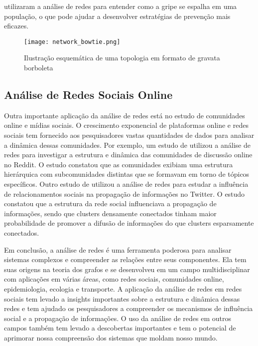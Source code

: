  utilizaram a análise de redes para entender como a gripe se espalha em uma população, o que pode ajudar a desenvolver estratégias de prevenção mais eficazes.
\begin{figure}[!htb]
    \caption{Ilustração esquemática de uma topologia em formato de gravata borboleta}
    \label{fig:network_bowtie}
    \centering
    \texttt{[image: network\_bowtie.png]}
\end{figure}

\subsection{Análise de Redes Sociais Online}

Outra importante aplicação da análise de redes está no estudo de comunidades online e mídias sociais. O crescimento exponencial de plataformas online e redes sociais tem fornecido aos pesquisadores vastas quantidades de dados para analisar a dinâmica dessas comunidades. Por exemplo, um estudo de utilizou a análise de redes para investigar a estrutura e dinâmica das comunidades de discussão online no Reddit. O estudo constatou que as comunidades exibiam uma estrutura hierárquica com subcomunidades distintas que se formavam em torno de tópicos específicos. Outro estudo de  utilizou a análise de redes para estudar a influência de relacionamentos sociais na propagação de informações no Twitter. O estudo constatou que a estrutura da rede social influenciava a propagação de informações, sendo que clusters densamente conectados tinham maior probabilidade de promover a difusão de informações do que clusters esparsamente conectados.

Em conclusão, a análise de redes é uma ferramenta poderosa para analisar sistemas complexos e compreender as relações entre seus componentes. Ela tem suas origens na teoria dos grafos e se desenvolveu em um campo multidisciplinar com aplicações em várias áreas, como redes sociais, comunidades online, epidemiologia, ecologia e transporte. A aplicação da análise de redes em redes sociais tem levado a insights importantes sobre a estrutura e dinâmica dessas redes e tem ajudado os pesquisadores a compreender os mecanismos de influência social e a propagação de informações. O uso da análise de redes em outros campos também tem levado a descobertas importantes e tem o potencial de aprimorar nossa compreensão dos sistemas que moldam nosso mundo.